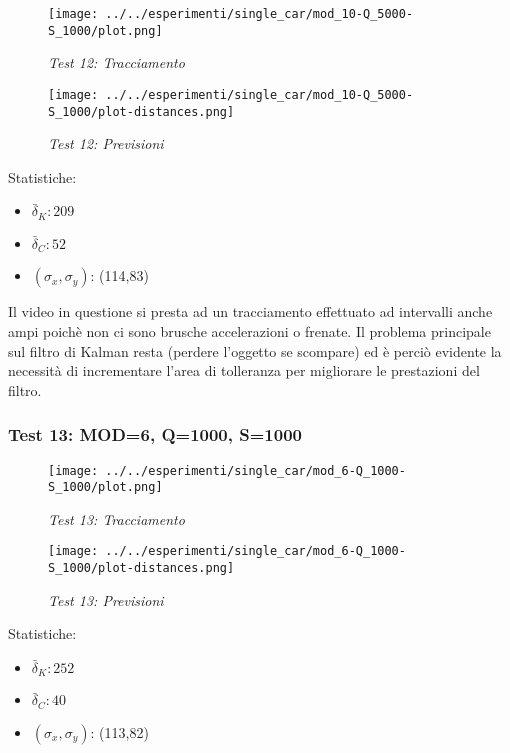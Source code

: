 \begin{figure}[hb]
\centering
\texttt{[image: ../../esperimenti/single\_car/mod\_10-Q\_5000-S\_1000/plot.png]}
\caption{\textit{Test 12: Tracciamento}}
\end{figure}

\begin{figure}[hb]
\centering
\texttt{[image: ../../esperimenti/single\_car/mod\_10-Q\_5000-S\_1000/plot-distances.png]}
\caption{\textit{Test 12: Previsioni}}
\end{figure}

Statistiche:
\begin{itemize}
\item \begin{math} \bar \delta_K:  209 \end{math}
\item \begin{math} \bar \delta_C:  52 \end{math}
\item \begin{math}(\sigma_x,\sigma_y)\end{math}: (114,83)
\end{itemize}

Il video in questione si presta ad un tracciamento effettuato ad intervalli anche ampi poichè non ci sono brusche accelerazioni o frenate. Il problema principale sul filtro di Kalman resta (perdere l'oggetto se scompare) ed è perciò evidente la necessità di incrementare l'area di tolleranza per migliorare le prestazioni del filtro. 

\newpage
\subsubsection{Test 13: MOD=6, Q=1000, S=1000}

\begin{figure}[hb]
\centering
\texttt{[image: ../../esperimenti/single\_car/mod\_6-Q\_1000-S\_1000/plot.png]}
\caption{\textit{Test 13: Tracciamento}}
\end{figure}

\begin{figure}[hb]
\centering
\texttt{[image: ../../esperimenti/single\_car/mod\_6-Q\_1000-S\_1000/plot-distances.png]}
\caption{\textit{Test 13: Previsioni}}
\end{figure}

Statistiche:
\begin{itemize}
\item \begin{math} \bar \delta_K: 252 \end{math}
\item \begin{math} \bar \delta_C: 40 \end{math}
\item \begin{math}(\sigma_x,\sigma_y)\end{math}: (113,82)
\end{itemize}

